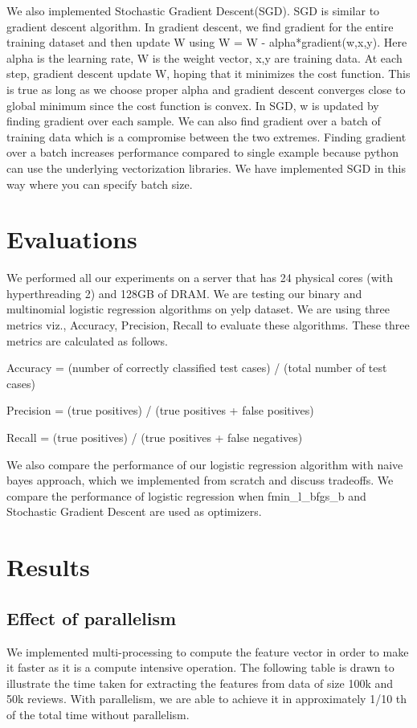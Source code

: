\documentclass{article}
\begin{document}
We also implemented Stochastic Gradient Descent(SGD). SGD is similar to gradient descent algorithm. In gradient descent, we find gradient for the entire training dataset and then update W using W = W - alpha*gradient(w,x,y). Here alpha is the learning rate, W is the weight vector, x,y are training data. At each step, gradient descent update W, hoping that it minimizes the cost function. This is true as long as we choose proper alpha and gradient descent converges close to global minimum since the cost function is convex. In SGD, w is updated by finding gradient over each sample. We can also find gradient over a batch of training data which is a compromise between the two extremes. Finding gradient over a batch increases performance compared to single example because python can use the underlying vectorization libraries. We have implemented SGD in this way where you can specify batch size.

\section{Evaluations}

We performed all our experiments on a server that has 24 physical cores (with hyperthreading 2) and 128GB of DRAM. We are testing our binary and multinomial logistic regression algorithms on yelp dataset. We are using three metrics viz., Accuracy, Precision, Recall to evaluate these algorithms. These three metrics are calculated as follows.


Accuracy = (number of correctly classified test cases) / (total number of test cases) 


Precision = (true positives) / (true positives + false positives)


Recall =  (true positives) / (true positives + false negatives)


We also compare the performance of our logistic regression algorithm with naive bayes approach, which we implemented from scratch and discuss tradeoffs. We compare the performance of logistic regression when fmin\_l\_bfgs\_b and Stochastic Gradient Descent are used as optimizers.

\section{Results}


\subsection{Effect of parallelism}
We implemented multi-processing to compute the feature vector in order to make it faster as it is a compute intensive operation. The following table is drawn to illustrate the time taken for extracting the features from data of size 100k and 50k reviews. With parallelism, we are able to achieve it in approximately 1/10 th of the total time without parallelism.
\end{document}
